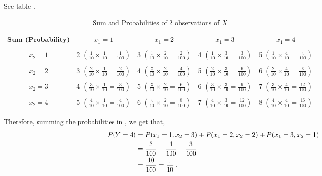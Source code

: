 \begin{subquestions}
\begin{subsubquestions}
\subsubquestion

See table .

\begin{table}[H]
	\centering
	\begin{tabular}{|c|c|c|c|c|}
		\hline
		 Sum (Probability) & $x_1=1$ & $x_1=2$ & $x_1=3$ & $x_1=4$ \\
		\hline 
		& & & &\\
		$x_2=1$ & 2 $\left(\frac{1}{10} \times \frac{1}{10}=\frac{1}{100}\right)$ & 3 $\left(\frac{1}{10} \times \frac{2}{10}=\frac{2}{100}\right)$ & 4 $\left(\frac{1}{10} \times \frac{3}{10}=\frac{3}{100}\right)$ & 5 $\left(\frac{1}{10} \times \frac{4}{10}=\frac{4}{100}\right)$ \\ & & & & \\
		
		$x_2=2$ & 3 $\left(\frac{2}{10} \times \frac{1}{10}=\frac{2}{100}\right)$ & 4 $\left(\frac{2}{10} \times \frac{2}{10}=\frac{4}{100}\right)$ & 5 $\left(\frac{2}{10} \times \frac{3}{10}=\frac{6}{100}\right)$ & 6 $\left(\frac{2}{10} \times \frac{4}{10}=\frac{8}{100}\right)$ \\ & & & & \\
		
		$x_2=3$ & 4 $\left(\frac{3}{10} \times \frac{1}{10}=\frac{3}{100}\right)$ & 5 $\left(\frac{3}{10} \times \frac{2}{10}=\frac{6}{100}\right)$ & 6 $\left(\frac{3}{10} \times \frac{3}{10}=\frac{9}{100}\right)$ & 7 $\left(\frac{3}{10} \times \frac{4}{10}=\frac{12}{100}\right)$ \\ & & & & \\
		
		$x_2=4$ & 5 $\left(\frac{4}{10} \times \frac{1}{10}=\frac{4}{100}\right)$ & 6 $\left(\frac{4}{10} \times \frac{2}{10}=\frac{8}{100}\right)$ & 7 $\left(\frac{4}{10} \times \frac{3}{10}=\frac{12}{100}\right)$ & 8 $\left(\frac{4}{10} \times \frac{4}{10}=\frac{16}{100}\right)$ \\
		\hline
	\end{tabular}
	\caption{\label{2008J:q4:Ytab} Sum and Probabilities of 2 observations of $X$}	
\end{table}

Therefore, summing the probabilities in , we get that,
\begin{align}
	P(Y=4) & = P(x_1=1,x_2=3)+P(x_1=2,x_2=2)+P(x_1=3,x_2=1) \nonumber \\
	       & = \frac{3}{100}+\frac{4}{100}+\frac{3}{100} \nonumber \\
	       & = \frac{10}{100} = \frac{1}{10} \,.
\end{align} 
	

\end{subsubquestions}
\end{subquestions}
